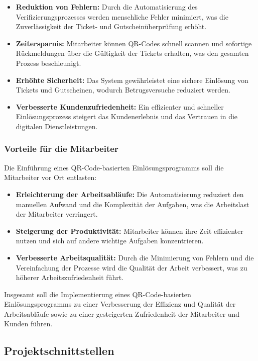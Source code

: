 \begin{itemize}
    \item \textbf{Reduktion von Fehlern:} Durch die Automatisierung des Verifizierungsprozesses werden menschliche Fehler minimiert, was die Zuverlässigkeit der Ticket- und Gutscheinüberprüfung erhöht.
    \item \textbf{Zeitersparnis:} Mitarbeiter können QR-Codes schnell scannen und sofortige Rückmeldungen über die Gültigkeit der Tickets erhalten, was den gesamten Prozess beschleunigt.
    \item \textbf{Erhöhte Sicherheit:} Das System gewährleistet eine sichere Einlösung von Tickets und Gutscheinen, wodurch Betrugsversuche reduziert werden.
    \item \textbf{Verbesserte Kundenzufriedenheit:} Ein effizienter und schneller Einlösungsprozess steigert das Kundenerlebnis und das Vertrauen in die digitalen Dienstleistungen.
\end{itemize}

\subsubsection{Vorteile für die Mitarbeiter}
Die Einführung eines QR-Code-basierten Einlösungsprogramms soll die Mitarbeiter vor Ort entlasten:

\begin{itemize}
    \item \textbf{Erleichterung der Arbeitsabläufe:} Die Automatisierung reduziert den manuellen Aufwand und die Komplexität der Aufgaben, was die Arbeitslast der Mitarbeiter verringert.
    \item \textbf{Steigerung der Produktivität:} Mitarbeiter können ihre Zeit effizienter nutzen und sich auf andere wichtige Aufgaben konzentrieren.
    \item \textbf{Verbesserte Arbeitsqualität:} Durch die Minimierung von Fehlern und die Vereinfachung der Prozesse wird die Qualität der Arbeit verbessert, was zu höherer Arbeitszufriedenheit führt.
\end{itemize}

Insgesamt soll die Implementierung eines QR-Code-basierten Einlösungsprogramms zu einer Verbesserung der Effizienz und Qualität der Arbeitsabläufe sowie zu einer gesteigerten Zufriedenheit der Mitarbeiter und Kunden führen.

\subsection{Projektschnittstellen} 
\label{sec:Projektschnittstellen}


